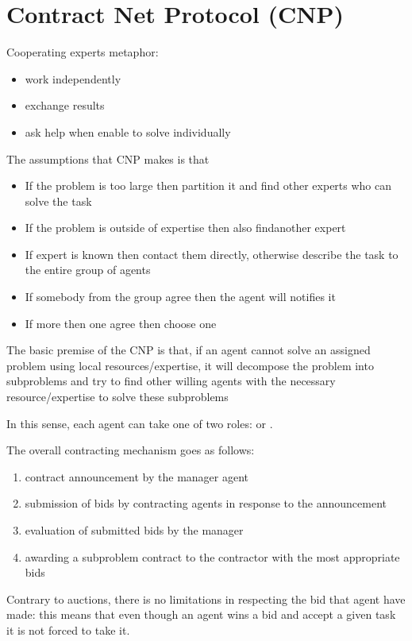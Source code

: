 \section{Contract Net Protocol (CNP)}
Cooperating experts metaphor:
\begin{itemize}
\item work independently
\item exchange results
\item ask help when enable to solve individually
\end{itemize}

The assumptions that CNP makes is that
\begin{itemize}
\item If the problem is too large then partition it and find other experts who can solve the task
\item If the problem is outside of expertise then also findanother expert
\item If expert is known then contact them directly, otherwise describe the task to the entire group of agents
\item If somebody from the group agree then the agent will notifies it
\item If more then one agree then choose one
\end{itemize}

The basic premise of the CNP is that, if an agent cannot solve an assigned problem using local resources/expertise, it will decompose the problem into subproblems and try to find other willing agents with the necessary resource/expertise to solve these subproblems

In this sense, each agent can take one of two roles:  or .

The overall contracting mechanism goes as follows:
\begin{enumerate}
\item contract announcement by the manager agent
\item submission of bids by contracting agents in response to the announcement
\item evaluation of submitted bids by the manager
\item awarding a subproblem contract to the contractor with the most appropriate bids
\end{enumerate}
Contrary to auctions, there is no limitations in respecting the bid that agent have made: this means that even though an agent wins a bid and accept a given task it is not forced to take it.

